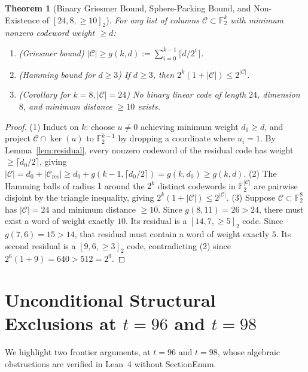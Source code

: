 \documentclass[11pt]{article}
\newtheorem{theorem}{Theorem}[section]
\theoremstyle{definition}
\newcommand{\F}{\mathbb{F}}
\newcommand{\code}[1]{{\ttfamily\small\renewcommand{\_}{\textunderscore\allowbreak}#1}}
\begin{document}
\begin{theorem}[Binary Griesmer Bound, Sphere-Packing Bound, and Non-Existence of {$[24, 8, \ge 10]_2$}]
\label{thm:code24}
For any list of columns $\mathcal{C} \subset \F_2^k$ with minimum nonzero codeword weight $\ge d$:
\begin{enumerate}[nosep]
  \item \emph{(Griesmer bound)} $|\mathcal{C}| \ge g(k, d) := \sum_{i=0}^{k-1} \lceil d / 2^i \rceil$.
  \item \emph{(Hamming bound for $d \ge 3$)} If $d \ge 3$, then $2^k (1 + |\mathcal{C}|) \le 2^{|\mathcal{C}|}$.
  \item \emph{(Corollary for $k = 8, |\mathcal{C}| = 24$)} No binary linear code of length $24$, dimension $8$, and minimum distance $\ge 10$ exists.
\end{enumerate}
\end{theorem}
\begin{proof}
(1) Induct on $k$: choose $u \neq 0$ achieving minimum weight $d_0 \ge d$, and project $\mathcal{C} \cap \ker(u)$ to $\F_2^{k-1}$ by dropping a coordinate where $u_i = 1$. By Lemma~\ref{lem:residual}, every nonzero codeword of the residual code has weight $\ge \lceil d_0 / 2 \rceil$, giving $|\mathcal{C}| = d_0 + |\mathcal{C}_{\mathrm{res}}| \ge d_0 + g(k-1, \lceil d_0/2\rceil) = g(k, d_0) \ge g(k, d)$.
(2) The Hamming balls of radius $1$ around the $2^k$ distinct codewords in $\F_2^{|\mathcal{C}|}$ are pairwise disjoint by the triangle inequality, giving $2^k(1 + |\mathcal{C}|) \le 2^{|\mathcal{C}|}$.
(3) Suppose $\mathcal{C} \subset \F_2^8$ has $|\mathcal{C}| = 24$ and minimum distance $\ge 10$. Since $g(8, 11) = 26 > 24$, there must exist a word of weight exactly $10$. Its residual is a $[14, 7, \ge 5]_2$ code. Since $g(7, 6) = 15 > 14$, that residual must contain a word of weight exactly $5$. Its second residual is a $[9, 6, \ge 3]_2$ code, contradicting (2) since $2^6(1 + 9) = 640 > 512 = 2^9$.
\end{proof}

\section{Unconditional Structural Exclusions at $t = 96$ and $t = 98$}
\label{sec:t9698}

We highlight two frontier arguments, at $t = 96$ and $t = 98$, whose algebraic obstructions are verified in Lean~4 without \code{SectionEnum}.
\end{document}
